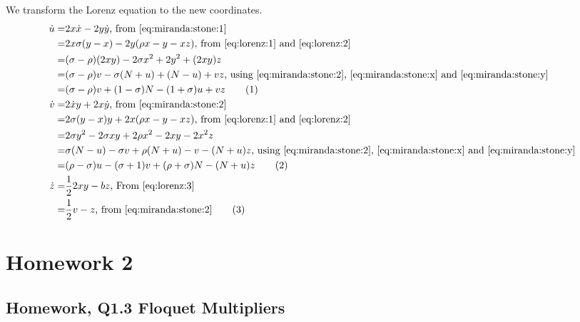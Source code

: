 \documentclass[]{article}
\newcommand\numberthis{\addtocounter{equation}{1}\tag{\theequation}}
\begin{document}
We transform the Lorenz equation to the new coordinates.
\begin{align*}
	\dot{u} =& 2 x \dot{x} - 2 y \dot{y} \text{, from \eqref{eq:miranda:stone:1}}\\
	=& 2x\sigma(y-x)-2y(\rho x - y -xz) \text{, from \eqref{eq:lorenz:1} and \eqref{eq:lorenz:2}}\\
	=&( \sigma - \rho)(2xy) -2\sigma x^2  + 2y^2 + (2xy)z\\
	=& ( \sigma - \rho) v -\sigma (N+u) + (N-u) + vz \text{, using \eqref{eq:miranda:stone:2}, \eqref{eq:miranda:stone:x} and \eqref{eq:miranda:stone:y}}\\ 
	=& ( \sigma - \rho) v + (1-\sigma)N - (1+\sigma)u +vz \numberthis \label{eq:miranda:stone:de:u}\\
	\dot{v} =& 2 \dot{x} y + 2 x \dot{y} \text{, from \eqref{eq:miranda:stone:2}}\\
	=& 2\sigma(y-x)y+2x(\rho x-y-xz)  \text{, from \eqref{eq:lorenz:1} and \eqref{eq:lorenz:2}}\\
	=& 2 \sigma y^2 -2 \sigma x y + 2\rho x^2 -2xy -2 x^2 z\\
	=&  \sigma (N-u) - \sigma v + \rho (N+u) -v - (N+u) z \text{, using \eqref{eq:miranda:stone:2}, \eqref{eq:miranda:stone:x} and \eqref{eq:miranda:stone:y}}\\
	=& (\rho-\sigma) u - (\sigma+1)v + (\rho+\sigma)N - (N+u) z \numberthis \label{eq:miranda:stone:de:v}\\
	\dot{z} =& \frac{1}{2} 2xy - bz \text{, From \eqref{eq:lorenz:3}} \\
	=& \frac{1}{2}v - z \text{, from \eqref{eq:miranda:stone:2}} \numberthis \label{eq:miranda:stone:de:z}
\end{align*}
\section{Homework 2}

\subsection{Homework, Q1.3 Floquet Multipliers}
\end{document}
